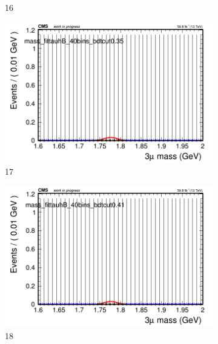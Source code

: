 \begin{figure}[h!]
\begin{subfigure}{0.2\textwidth}
        \caption{16}
    \end{subfigure}
    \begin{subfigure}{0.2\textwidth}
        \includegraphics[width=\textwidth]{unfixed_exp/plots/tauhB/massfit_tauhB_40bins_bdtcut0.35.png}
        \caption{17}
    \end{subfigure}
    \begin{subfigure}{0.2\textwidth}
        \includegraphics[width=\textwidth]{unfixed_exp/plots/tauhB/massfit_tauhB_40bins_bdtcut0.41.png}
        \caption{18}
    \end{subfigure}
    \begin{subfigure}{0.2\textwidth}

\end{subfigure}
\end{figure}
